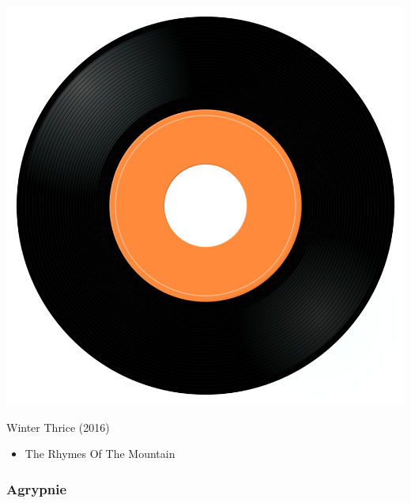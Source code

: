 \begin{minipage}[t]{0.25\textwidth}
\captionsetup{type=figure}
\includegraphics[width=\textwidth]{Images/cover.png}
\caption*{Winter Thrice (2016)}
\end{minipage}
\begin{minipage}[t]{0.25\textwidth}\vspace{0pt}
\begin{itemize}[nosep,leftmargin=1em,labelwidth=*,align=left]
	\setlength{\itemsep}{0pt}
	\item The Rhymes Of The Mountain
\end{itemize}
\end{minipage}

\subsubsection{Agrypnie}

